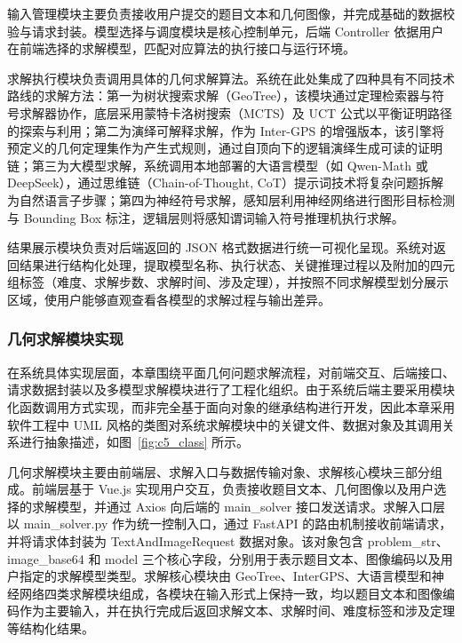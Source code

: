 输入管理模块主要负责接收用户提交的题目文本和几何图像，并完成基础的数据校验与请求封装。模型选择与调度模块是核心控制单元，后端 Controller 依据用户在前端选择的求解模型，匹配对应算法的执行接口与运行环境。

求解执行模块负责调用具体的几何求解算法。系统在此处集成了四种具有不同技术路线的求解方法：第一为树状搜索求解（GeoTree），该模块通过定理检索器与符号求解器协作，底层采用蒙特卡洛树搜索（MCTS）及 UCT 公式以平衡证明路径的探索与利用；第二为演绎可解释求解，作为 Inter-GPS 的增强版本，该引擎将预定义的几何定理集作为产生式规则，通过自顶向下的逻辑演绎生成可读的证明链；第三为大模型求解，系统调用本地部署的大语言模型（如 Qwen-Math 或 DeepSeek），通过思维链（Chain-of-Thought, CoT）提示词技术将复杂问题拆解为自然语言子步骤；第四为神经符号求解，感知层利用神经网络进行图形目标检测与 Bounding Box 标注，逻辑层则将感知谓词输入符号推理机执行求解。

结果展示模块负责对后端返回的 JSON 格式数据进行统一可视化呈现。系统对返回结果进行结构化处理，提取模型名称、执行状态、关键推理过程以及附加的四元组标签（难度、求解步数、求解时间、涉及定理），并按照不同求解模型划分展示区域，使用户能够直观查看各模型的求解过程与输出差异。


\subsubsection{几何求解模块实现}

在系统具体实现层面，本章围绕平面几何问题求解流程，对前端交互、后端接口、请求数据封装以及多模型求解模块进行了工程化组织。由于系统后端主要采用模块化函数调用方式实现，而非完全基于面向对象的继承结构进行开发，因此本章采用软件工程中 UML 风格的类图对系统求解模块中的关键文件、数据对象及其调用关系进行抽象描述，如图~\ref{fig:c5_class} 所示。

几何求解模块主要由前端层、求解入口与数据传输对象、求解核心模块三部分组成。前端层基于 Vue.js 实现用户交互，负责接收题目文本、几何图像以及用户选择的求解模型，并通过 Axios 向后端的 main\_solver 接口发送请求。求解入口层以 main\_solver.py 作为统一控制入口，通过 FastAPI 的路由机制接收前端请求，并将请求体封装为 TextAndImageRequest 数据对象。该对象包含 problem\_str、image\_base64 和 model 三个核心字段，分别用于表示题目文本、图像编码以及用户指定的求解模型类型。求解核心模块由 GeoTree、InterGPS、大语言模型和神经网络四类求解模块组成，各模块在输入形式上保持一致，均以题目文本和图像编码作为主要输入，并在执行完成后返回求解文本、求解时间、难度标签和涉及定理等结构化结果。

